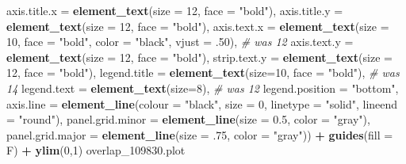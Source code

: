 \documentclass[
]{article}
\newenvironment{Shaded}{\begin{snugshade}}{\end{snugshade}}
\newcommand{\CommentTok}[1]{\textcolor[rgb]{0.56,0.35,0.01}{\textit{#1}}}
\newcommand{\DataTypeTok}[1]{\textcolor[rgb]{0.13,0.29,0.53}{#1}}
\newcommand{\DecValTok}[1]{\textcolor[rgb]{0.00,0.00,0.81}{#1}}
\newcommand{\FloatTok}[1]{\textcolor[rgb]{0.00,0.00,0.81}{#1}}
\newcommand{\KeywordTok}[1]{\textcolor[rgb]{0.13,0.29,0.53}{\textbf{#1}}}
\newcommand{\NormalTok}[1]{#1}
\newcommand{\OperatorTok}[1]{\textcolor[rgb]{0.81,0.36,0.00}{\textbf{#1}}}
\newcommand{\StringTok}[1]{\textcolor[rgb]{0.31,0.60,0.02}{#1}}
\begin{document}
\begin{Shaded}
\begin{Highlighting}[]
        \DataTypeTok{axis.title.x =} \KeywordTok{element_text}\NormalTok{(}\DataTypeTok{size =} \DecValTok{12}\NormalTok{, }\DataTypeTok{face =} \StringTok{"bold"}\NormalTok{),}
        \DataTypeTok{axis.title.y =} \KeywordTok{element_text}\NormalTok{(}\DataTypeTok{size =} \DecValTok{12}\NormalTok{, }\DataTypeTok{face =} \StringTok{"bold"}\NormalTok{),}
        \DataTypeTok{axis.text.x =} \KeywordTok{element_text}\NormalTok{(}\DataTypeTok{size =} \DecValTok{10}\NormalTok{, }\DataTypeTok{face =} \StringTok{"bold"}\NormalTok{, }
                                   \DataTypeTok{color =} \StringTok{"black"}\NormalTok{, }\DataTypeTok{vjust =} \FloatTok{.50}\NormalTok{), }\CommentTok{# was 12}
        \DataTypeTok{axis.text.y =} \KeywordTok{element_text}\NormalTok{(}\DataTypeTok{size =} \DecValTok{12}\NormalTok{, }\DataTypeTok{face =} \StringTok{"bold"}\NormalTok{),}
        \DataTypeTok{strip.text.y =} \KeywordTok{element_text}\NormalTok{(}\DataTypeTok{size =} \DecValTok{12}\NormalTok{, }\DataTypeTok{face =} \StringTok{"bold"}\NormalTok{),}
        \DataTypeTok{legend.title =} \KeywordTok{element_text}\NormalTok{(}\DataTypeTok{size=}\DecValTok{10}\NormalTok{, }\DataTypeTok{face =} \StringTok{"bold"}\NormalTok{), }\CommentTok{# was 14}
        \DataTypeTok{legend.text =} \KeywordTok{element_text}\NormalTok{(}\DataTypeTok{size=}\DecValTok{8}\NormalTok{), }\CommentTok{# was 12}
        \DataTypeTok{legend.position =} \StringTok{"bottom"}\NormalTok{,}
        \DataTypeTok{axis.line =} \KeywordTok{element_line}\NormalTok{(}\DataTypeTok{colour =} \StringTok{"black"}\NormalTok{, }
                                 \DataTypeTok{size =} \DecValTok{0}\NormalTok{, }\DataTypeTok{linetype =} \StringTok{"solid"}\NormalTok{, }\DataTypeTok{lineend =} \StringTok{"round"}\NormalTok{),}
        \DataTypeTok{panel.grid.minor =} \KeywordTok{element_line}\NormalTok{(}\DataTypeTok{size =} \FloatTok{0.5}\NormalTok{, }\DataTypeTok{color =} \StringTok{"gray"}\NormalTok{), }
        \DataTypeTok{panel.grid.major =} \KeywordTok{element_line}\NormalTok{(}\DataTypeTok{size =} \FloatTok{.75}\NormalTok{, }\DataTypeTok{color =} \StringTok{"gray"}\NormalTok{)) }\OperatorTok{+}\StringTok{ }
\StringTok{  }\KeywordTok{guides}\NormalTok{(}\DataTypeTok{fill =}\NormalTok{ F) }\OperatorTok{+}\StringTok{ }
\StringTok{  }\KeywordTok{ylim}\NormalTok{(}\DecValTok{0}\NormalTok{,}\DecValTok{1}\NormalTok{) }
\NormalTok{overlap_}\FloatTok{109830.}\NormalTok{plot}
\end{Highlighting}
\end{Shaded}
\end{document}
